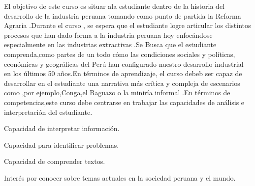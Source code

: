 \begin{syllabus}


\begin{justification}
El objetivo de este curso es situar ala estudiante dentro de la historia del desarrollo de la industria peruana tomando como punto de partida la Reforma Agraria .Durante el curso , se espera que el estudiante logre articular los distintos 
procesos que han dado forma a  la industria peruana hoy enfocándose  especialmente en las industrias extractivas .Se Busca que el estudiante  comprenda,como partes de un todo cómo las condiciones sociales y políticas,
económicas y geográficas del Perú  han configurado nuestro desarrollo industrial en los últimos 50 años.En términos de aprendizaje, el curso debeb ser capaz de desarrollar en el estudiante  una narrativa más crítica y compleja de escenarios como ,por ejemplo,Conga,el  Baguazo 
o la  miniría informal .En términos de competencias,este curso debe centrarse en  trabajar las capacidades de análisis e interpretación del estudiante.

\end{justification}

\begin{goals}
\item Capacidad de interpretar información.
\item Capacidad para identificar problemas.
\item Capacidad de comprender textos.
\item Interés por conocer sobre temas actuales en la sociedad peruana y el mundo. 
\end{goals}

\begin{outcomes}
    \item {} 
    \item {} 
    \item {} 
    \item {} 
    \item {} 
\end{outcomes}

\begin{competences}
    \item {}
    \item {}
    \item {}
    \item {}
\end{competences}


\end{syllabus}
